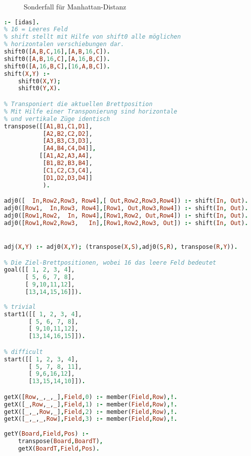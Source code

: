 \documentclass{scrreprt}
\begin{document}
\begin{anumerate}
\begin{figure}[!h]
\end{figure}
\begin{figure}[!h]
\centering
{}
\caption{Sonderfall für Manhattan-Distanz}
\label{fig:man2}
\end{figure}
\item 
\begin{lstlisting}[language=Prolog]
:- [idas].
% 16 = Leeres Feld
% shift stellt mit Hilfe von shift0 alle möglichen
% horizontalen verschiebungen dar.
shift0([A,B,C,16],[A,B,16,C]).
shift0([A,B,16,C],[A,16,B,C]).
shift0([A,16,B,C],[16,A,B,C]).
shift(X,Y) :-
    shift0(X,Y);
    shift0(Y,X).

% Transponiert die aktuellen Brettposition
% Mit Hilfe einer Transponierung sind horizontale
% und vertikale Züge identisch
transpose([[A1,B1,C1,D1],
           [A2,B2,C2,D2],
           [A3,B3,C3,D3],
           [A4,B4,C4,D4]],
          [[A1,A2,A3,A4],
           [B1,B2,B3,B4],
           [C1,C2,C3,C4],
           [D1,D2,D3,D4]]
           ).

adj0([  In,Row2,Row3, Row4],[ Out,Row2,Row3,Row4]) :- shift(In, Out).
adj0([Row1,  In,Row3, Row4],[Row1, Out,Row3,Row4]) :- shift(In, Out).
adj0([Row1,Row2,  In, Row4],[Row1,Row2, Out,Row4]) :- shift(In, Out).
adj0([Row1,Row2,Row3,   In],[Row1,Row2,Row3, Out]) :- shift(In, Out).


adj(X,Y) :- adj0(X,Y); (transpose(X,S),adj0(S,R), transpose(R,Y)).

% Die Ziel-Brettpositionen, wobei 16 das leere Feld bedeutet
goal([[ 1, 2, 3, 4],
      [ 5, 6, 7, 8],
      [ 9,10,11,12],
      [13,14,15,16]]).
      
% trivial
start1([[ 1, 2, 3, 4],
       [ 5, 6, 7, 8],
       [ 9,10,11,12],
       [13,14,16,15]]).

% difficult
start([[ 1, 2, 3, 4],
       [ 5, 7, 8, 11],
       [ 9,6,16,12],
       [13,15,14,10]]).

getX([Row,_,_,_],Field,0) :- member(Field,Row),!.
getX([_,Row,_,_],Field,1) :- member(Field,Row),!.
getX([_,_,Row,_],Field,2) :- member(Field,Row),!.
getX([_,_,_,Row],Field,3) :- member(Field,Row),!.
    
getY(Board,Field,Pos) :-
    transpose(Board,BoardT),
    getX(BoardT,Field,Pos).
    

\end{lstlisting}
\end{anumerate}
\end{document}
